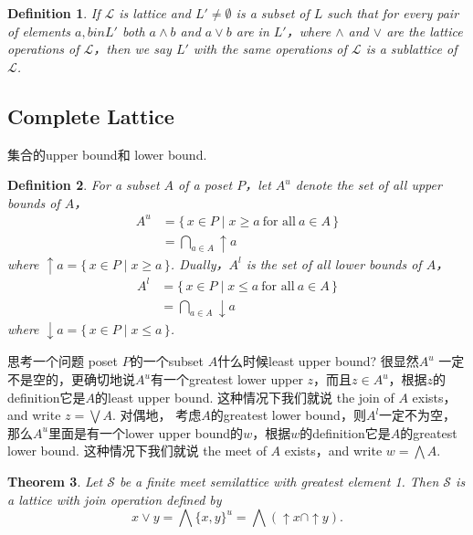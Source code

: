 \documentclass{article}
\newtheorem{theorem}{Theorem}[section]
\newtheorem{definition}[theorem]{Definition}
\newcommand\Set[2]{\{\,#1\mid#2\,\}} %
\newcommand\slattice{\mathcal{S}}
\newcommand\lattice{\mathcal{L}}
\begin{document}
\begin{definition}
\rm If $\lattice$ is lattice and $L' \neq \emptyset$ is a subset of $L$ such that for every pair of elements $a,b in L'$ both $a \wedge b$ and $a \vee b$ are in $L'$，where $\wedge$ and $\vee$ are the lattice operations of $\lattice$，then we say $L'$ with the same operations of $\lattice$ is a {\color{red} sublattice} of $\lattice$. 
\end{definition}

\newpage
\subsection{Complete Lattice}
{\color{red} 集合的upper bound和 lower bound}.
\begin{definition}
\rm For a subset $A$ of a poset $P$，let $A^u$ denote the set of all upper bounds of $A$，
$$
\begin{aligned}
A^u &= \Set{x \in P}{x \geq a\ \text{for all}\ a \in A} \\
	&= \bigcap\limits_{a \in A} \uparrow a
\end{aligned}
$$
where $\uparrow a = \Set{x \in P}{x \geq a}$. Dually，$A^l$ is the set of all lower bounds of $A$，
$$
\begin{aligned}
A^l &= \Set{x \in P}{x \leq a\ \text{for all}\ a \in A} \\
	&= \bigcap\limits_{a \in A} \downarrow a
\end{aligned}	
$$
where $\downarrow a = \Set{x \in P}{x \leq a}$.
\end{definition}

思考一个问题{\color{red} poset $P$的一个subset $A$什么时候least upper bound}? 很显然$A^u$ 一定不是空的，更确切地说$A^u$有一个greatest lower upper $z$，而且$z \in A^u$，根据$z$的definition它是$A$的least upper bound. 这种情况下我们就说{\color{red} the join of $A$ exists，and write $z = \bigvee A$}. 对偶地，{\color{red} 考虑$A$的greatest lower bound}，则$A^l$一定不为空，那么$A^u$里面是有一个lower upper bound的$w$，根据$w$的definition它是$A$的greatest lower bound. 这种情况下我们就说{\color{red} the meet of $A$ exists，and write $w = \bigwedge A$}.


\begin{theorem}
\rm Let $\slattice$ be a finite meet semilattice with greatest element 1. Then $\slattice$ is a lattice with join operation defined by 
$$
x \vee y = \bigwedge \{x,y\} ^u = \bigwedge (\uparrow x \cap \uparrow y).
$$
\end{theorem}
\end{document}
